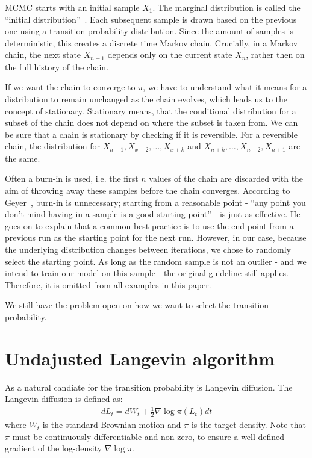 MCMC starts with an initial sample $X_1$. The marginal distribution is called the 
``initial distribution''~\cite{geyer2011introduction}.
Each subsequent sample is drawn based on the previous one using a transition probability distribution. Since the amount of samples is deterministic, this creates a discrete time Markov chain. Crucially, in a Markov chain, the next state $X_{n+1}$ depends only on the current state $X_n$, rather then on the full history of the chain.

If we want the chain to converge to $\pi$, we have to understand what it means for a distribution to remain unchanged
as the chain evolves, which leads us to the concept of stationary.
Stationary means, that the conditional distribution for a 
subset of the chain does not depend on where the subset is taken from.
We can be sure that a chain is stationary by checking if it is reversible. 
For a reversible chain, the distribution for $X_{n+1},X_{x+2},\dots,X_{x+k}$ and $X_{n+k},\dots,X_{n+2},X_{n+1}$ are the same.

Often a burn-in is used, i.e. 
the first $n$ values of the chain are discarded with the aim of throwing away these samples before the chain converges. 
According to Geyer~\cite{geyer2011introduction}, burn-in is unnecessary; starting from a reasonable point - ``any point you don't mind having in a sample is a good starting point'' - is just as effective. He goes on to explain that a common best practice is to use the end point from a previous run as the starting point for the next run. However, in our case, because the underlying distribution changes between iterations, we chose to randomly select the starting point. As long as the random sample is not an outlier - and we intend to train our model on this sample - the original guideline still applies.
Therefore, it is omitted from all examples in this paper.

We still have the problem open on how we want to select the transition probability.

\section{Undajusted Langevin algorithm}\label{sec:ULA}
As a natural candiate for the transition probability is Langevin diffusion. The Langevin diffusion is defined as:
\begin{align}
    dL_t=dW_t+\frac{1}{2}\nabla \log{\pi(L_t)}dt
\end{align}
where $W_t$ is the standard Brownian motion and $\pi$ is the target density. Note that $\pi$ must be continuously differentiable and non-zero, to ensure a well-defined gradient of the log-density $\nabla\log{\pi}$. 

